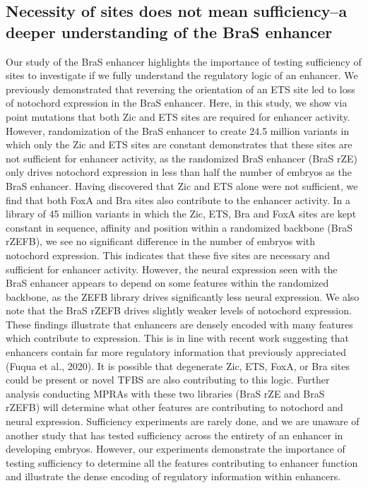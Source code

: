 \subsection{Necessity of sites does not mean sufficiency--a deeper understanding of the BraS enhancer}

Our study of the BraS enhancer highlights the importance of testing sufficiency of sites to investigate if we fully understand the regulatory logic of an enhancer. We previously demonstrated that reversing the orientation of an ETS site led to loss of notochord expression in the BraS enhancer. Here, in this study, we show via point mutations that both Zic and ETS sites are required for enhancer activity. However, randomization of the BraS enhancer to create 24.5 million variants in which only the Zic and ETS sites are constant demonstrates that these sites are not sufficient for enhancer activity, as the randomized BraS enhancer (BraS rZE) only drives notochord expression in less than half the number of embryos as the BraS enhancer. Having discovered that Zic and ETS alone were not sufficient, we find that both FoxA and Bra sites also contribute to the enhancer activity. In a library of 45 million variants in which the Zic, ETS, Bra and FoxA sites are kept constant in sequence, affinity and position within a randomized backbone (BraS rZEFB), we see no significant difference in the number of embryos with notochord expression. This indicates that these five sites are necessary and sufficient for enhancer activity. However, the neural expression  seen with the BraS enhancer appears to depend on some features within the randomized backbone, as the ZEFB library drives significantly less neural expression. We also note that the BraS rZEFB drives slightly weaker levels of notochord expression. These findings illustrate that enhancers are densely encoded with many features which contribute to expression. This is in line with recent work suggesting that enhancers contain far more regulatory information that previously appreciated (Fuqua et al., 2020). It is possible that degenerate Zic, ETS, FoxA, or Bra sites could be present or novel TFBS are also contributing to this logic. Further analysis conducting MPRAs with these two libraries (BraS rZE and BraS rZEFB) will determine what other features are contributing to  notochord and neural expression. Sufficiency experiments are rarely done, and we are unaware of another study that has tested sufficiency across the entirety of an enhancer in developing embryos. However, our experiments demonstrate the importance of testing sufficiency to determine all the features contributing to enhancer function and illustrate the dense encoding of regulatory information within enhancers. 

